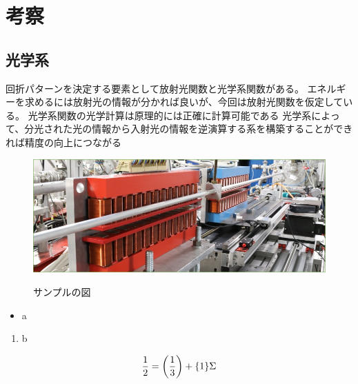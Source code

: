 \documentclass[a4paper,11pt,uplatex]{jsarticle}
\begin{document}
\section{考察}
\subsection{光学系}
回折パターンを決定する要素として放射光関数と光学系関数がある。
エネルギーを求めるには放射光の情報が分かれば良いが、今回は放射光関数を仮定している。
光学系関数の光学計算は原理的には正確に計算可能である
光学系によって、分光された光の情報から入射光の情報を逆演算する系を構築することができれば精度の向上につながる









\clearpage

\begin{figure}[tb]
  \centering
  \includegraphics[width=0.8\linewidth]{image/1-1.jpg}\\
  \caption{サンプルの図}
  \label{sample_image}
\end{figure}

\begin{itemize}
  \item a
\end{itemize}
\begin{enumerate}
  \item b
\end{enumerate}

\begin{align}
\frac{1}{2} = \qty(\frac{1}{3}) + \qty{1}\Sigma
\end{align}
\end{document}
